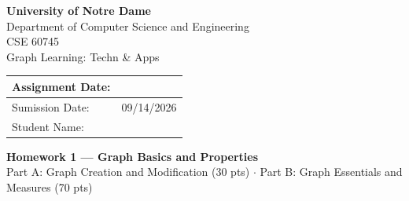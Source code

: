 \documentclass[11pt,a4paper]{article}
\begin{document}
\thispagestyle{fancy}
\begin{center}
\vspace*{2.0cm}
{\Huge\bfseries University of Notre Dame}\\[0.8cm]
{\LARGE Department of Computer Science and Engineering}\\[1.6cm]
{\LARGE CSE 60745}\\[0.5cm]
{\LARGE Graph Learning: Techn \& Apps}\\[1.6cm]

\renewcommand{\arraystretch}{2.2}
\begin{tabular}{|p{}|p{}|}
\hline
Assignment Date: & \\ \hline
Sumission Date: & 09/14/2026 \\ \hline
Student Name: & \\ \hline
\end{tabular}
\end{center}
\vfill
\begin{center}
{\large\bfseries Homework 1 --- Graph Basics and Properties}\\[0.3cm]
Part A: Graph Creation and Modification (30 pts) \quad$\cdot$\quad
Part B: Graph Essentials and Measures (70 pts)
\end{center}
\newpage


\clearpage

\clearpage

\end{document}
